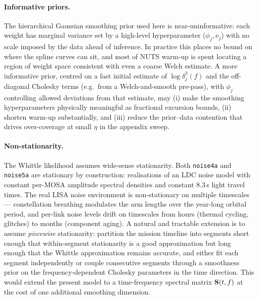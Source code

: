 \documentclass[%
	reprint,
	nofootinbib,
	amsmath,
	amssymb,
	aps,
]{revtex4-2}
\renewcommand{\S}{{\bf S}}
\begin{document}
	\paragraph{Informative priors.}
	The hierarchical Gaussian smoothing prior used here is
	near-uninformative: each weight has marginal variance set by a
	high-level hyperparameter ($\phi_{j}, \nu_{j}$) with no scale
	imposed by the data ahead of inference. In practice this places no
	bound on where the spline curves can sit, and most of NUTS
	warm-up is spent locating a region of weight space consistent with
	even a coarse Welch estimate. A more informative prior, centred on
	a fast initial estimate of $\log\delta_{j}^{2}(f)$ and the
	off-diagonal Cholesky terms (e.g.\ from a Welch-and-smooth pre-pass),
	with $\phi_{j}$ controlling allowed deviations from that estimate,
	may (i) make the smoothing hyperparameters physically meaningful as
	fractional excursion bounds, (ii) shorten warm-up substantially, and
	(iii) reduce the prior--data contention that drives over-coverage at
	small $\eta$ in the appendix sweep.

	\paragraph{Non-stationarity.}
	The Whittle likelihood assumes wide-sense stationarity. Both
	\texttt{noise4a} and \texttt{noise5a} are stationary by
	construction: realisations of an LDC noise model with constant
	per-MOSA amplitude spectral densities and constant $8.3$\,s light
	travel times. The real LISA noise environment is non-stationary on
	multiple timescales --- constellation breathing modulates the arm
	lengths over the year-long orbital period, and per-link noise levels
	drift on timescales from hours (thermal cycling, glitches) to
	months (component aging). A natural and tractable extension is to
	assume \emph{piecewise} stationarity: partition the mission timeline
	into segments short enough that within-segment stationarity is a
	good approximation but long enough that the Whittle approximation
	remains accurate, and either fit each segment independently or
	couple consecutive segments through a smoothness prior on the
	frequency-dependent Cholesky parameters in the time direction. This
	would extend the present model to a time-frequency spectral matrix
	$\S(t,f)$ at the cost of one additional smoothing dimension.
\end{document}

